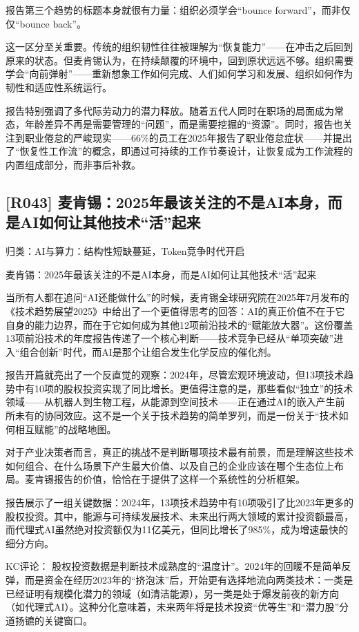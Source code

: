 \documentclass[11pt]{ctexart}
\begin{document}
报告第三个趋势的标题本身就很有力量：组织必须学会“bounce forward”，而非仅仅“bounce back”。

这一区分至关重要。传统的组织韧性往往被理解为“恢复能力”——在冲击之后回到原来的状态。但麦肯锡认为，在持续颠覆的环境中，回到原状远远不够。组织需要学会“向前弹射”——重新想象工作如何完成、人们如何学习和发展、组织如何作为韧性和适应性系统运行。

报告特别强调了多代际劳动力的潜力释放。随着五代人同时在职场的局面成为常态，年龄差异不再是需要管理的“问题”，而是需要挖掘的“资源”。同时，报告也关注到职业倦怠的严峻现实——66\%的员工在2025年报告了职业倦怠症状——并提出了“恢复性工作流”的概念，即通过可持续的工作节奏设计，让恢复成为工作流程的内置组成部分，而非事后补救。

\subsection{[R043] 麦肯锡：2025年最该关注的不是AI本身，而是AI如何让其他技术“活”起来}
{\small\color{refgray}归类：AI与算力：结构性短缺蔓延，Token竞争时代开启}

麦肯锡：2025年最该关注的不是AI本身，而是AI如何让其他技术“活”起来

当所有人都在追问“AI还能做什么”的时候，麦肯锡全球研究院在2025年7月发布的《技术趋势展望2025》中给出了一个更值得思考的回答：AI的真正价值不在于它自身的能力边界，而在于它如何成为其他12项前沿技术的“赋能放大器”。这份覆盖13项前沿技术的年度报告传递了一个核心判断——技术竞争已经从“单项突破”进入“组合创新”时代，而AI是那个让组合发生化学反应的催化剂。

报告开篇就亮出了一个反直觉的观察：2024年，尽管宏观环境波动，但13项技术趋势中有10项的股权投资实现了同比增长。更值得注意的是，那些看似“独立”的技术领域——从机器人到生物工程，从能源到空间技术——正在通过AI的嵌入产生前所未有的协同效应。这不是一个关于技术趋势的简单罗列，而是一份关于“技术如何相互赋能”的战略地图。

对于产业决策者而言，真正的挑战不是判断哪项技术最有前景，而是理解这些技术如何组合、在什么场景下产生最大价值、以及自己的企业应该在哪个生态位上布局。麦肯锡报告的价值，恰恰在于提供了这样一个系统性的分析框架。

报告展示了一组关键数据：2024年，13项技术趋势中有10项吸引了比2023年更多的股权投资。其中，能源与可持续发展技术、未来出行两大领域的累计投资额最高，而代理式AI虽然绝对投资额仅为11亿美元，但同比增长了985\%，成为增速最快的细分方向。

KC评论： 股权投资数据是判断技术成熟度的“温度计”。2024年的回暖不是简单反弹，而是资金在经历2023年的“挤泡沫”后，开始更有选择地流向两类技术：一类是已经证明有规模化潜力的领域（如清洁能源），另一类是处于爆发前夜的新方向（如代理式AI）。这种分化意味着，未来两年将是技术投资“优等生”和“潜力股”分道扬镳的关键窗口。
\end{document}
